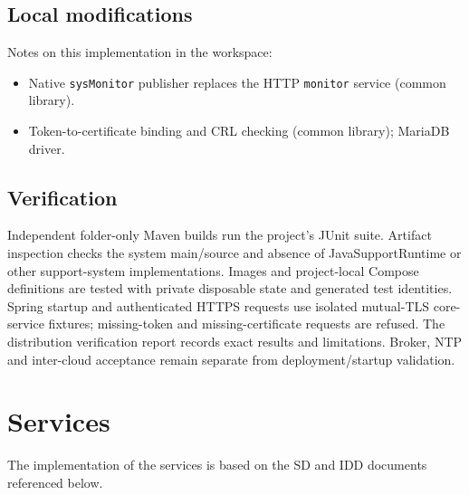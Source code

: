 \documentclass[a4paper]{arrowhead}
\begin{document}
\subsection{Local modifications}
\label{sec:local}

Notes on this implementation in the workspace:
\begin{itemize}
  \item Native \texttt{sysMonitor} publisher replaces the HTTP \texttt{monitor} service (common library).
  \item Token-to-certificate binding and CRL checking (common library); MariaDB driver.
\end{itemize}

\subsection{Verification}

Independent folder-only Maven builds run the project's JUnit suite. Artifact inspection checks the system main/source and absence of JavaSupportRuntime or other support-system implementations. Images and project-local Compose definitions are tested with private disposable state and generated test identities. Spring startup and authenticated HTTPS requests use isolated mutual-TLS core-service fixtures; missing-token and missing-certificate requests are refused. The distribution verification report records exact results and limitations. Broker, NTP and inter-cloud acceptance remain separate from deployment/startup validation.

\newpage

\section{Services}
\label{sec:services}

The implementation of the services is based on the SD and IDD documents referenced below.
\end{document}
